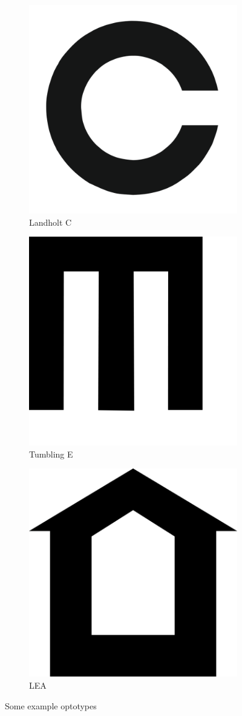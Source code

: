 \documentclass[12pt,a4paper,notitlepage]{report}
\begin{document}
\begin{figure}[ht!]
\centering
\begin{subfigure}{.3\textwidth}
  \centering
  \includegraphics[width=.4\linewidth]{images/landholt_c_optotype.png}
  \caption{Landholt C}
  \label{fig:landholt_c}
\end{subfigure}%
\begin{subfigure}{.3\textwidth}
  \centering
  \includegraphics[width=.4\linewidth]{images/tumbling_e_optotype.png}
  \caption{Tumbling E}
  \label{fig:tumbling_e}
\end{subfigure}
\begin{subfigure}{.3\textwidth}
  \centering
  \includegraphics[width=.4\linewidth]{images/lea_optotype.png}
  \caption{LEA}
  \label{fig:lea}
\end{subfigure}
\caption{Some example optotypes}
\label{fig:optotypes_example}
\end{figure}

\pagebreak
\end{document}
